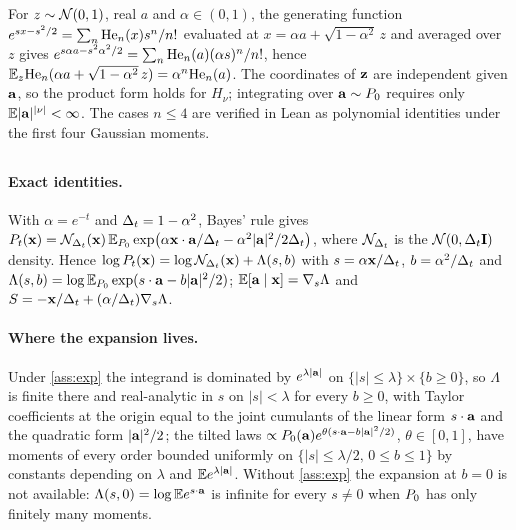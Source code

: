 \subsection{}
For $z\sim\mathcal{N}\!\left(0,1\right)$, real $a$ and $\alpha\in(0,1)$, the
generating function $e^{sx-s^2/2}=\sum_n\mathrm{He}_{n}(x)s^n/n!$ evaluated at
$x=\alpha a+\sqrt{1-\alpha^2}\,z$ and averaged over $z$ gives
$e^{s\alpha a-s^2\alpha^2/2}=\sum_n\mathrm{He}_{n}(a)(\alpha s)^n/n!$, hence
$\mathbb{E}_z\mathrm{He}_{n}(\alpha a+\sqrt{1-\alpha^2}\,z)=\alpha^n\mathrm{He}_{n}(a)$. The coordinates of $\mathbf{z}$ are
independent given $\mathbf{a}$, so the product form holds for $H_\nu$; integrating over
$\mathbf{a}\sim P_0$ requires only $\mathbb{E}|\mathbf{a}|^{|\nu|}<\infty$. The cases $n\le4$ are verified in
Lean as polynomial identities under the first four Gaussian moments.

\subsection{}
\label{app:proof-decay}

\paragraph{Exact identities.}
With $\alpha=e^{-t}$ and $\Delta_t=1-\alpha^2$, Bayes' rule gives
$P_t(\mathbf{x})=\mathcal{N}_{\Delta_t}(\mathbf{x})\,\mathbb{E}_{P_0}\exp\bigl(\alpha\mathbf{x}\cdot\mathbf{a}/\Delta_t-\alpha^2|\mathbf{a}|^2/2\Delta_t\bigr)$,
where $\mathcal{N}_{\Delta_t}$ is the $\mathcal{N}\!\left(0,\Delta_t\mathbf{I}\right)$ density. Hence
$\log P_t(\mathbf{x})=\log\mathcal{N}_{\Delta_t}(\mathbf{x})+\Lambda(s,b)$ with $s=\alpha\mathbf{x}/\Delta_t$, $b=\alpha^2/\Delta_t$
and $\Lambda(s,b)=\log\mathbb{E}_{P_0}\exp(s\cdot\mathbf{a}-b|\mathbf{a}|^2/2)$;
$\mathbb{E}[\mathbf{a}\mid\mathbf{x}]=\nabla_s\Lambda$ and $S=-\mathbf{x}/\Delta_t+(\alpha/\Delta_t)\nabla_s\Lambda$.

\paragraph{Where the expansion lives.}
Under \cref{ass:exp} the integrand is dominated by $e^{\lambda|\mathbf{a}|}$ on
$\{|s|\le\lambda\}\times\{b\ge0\}$, so $\Lambda$ is finite there and real-analytic in $s$
on $|s|<\lambda$ for every $b\ge0$, with Taylor coefficients at the origin equal to the
joint cumulants of the linear form $s\cdot\mathbf{a}$ and the quadratic form $|\mathbf{a}|^2/2$; the
tilted laws $\propto P_0(\mathbf{a})e^{\theta(s\cdot\mathbf{a}-b|\mathbf{a}|^2/2)}$, $\theta\in[0,1]$, have
moments of every order bounded uniformly on $\{|s|\le\lambda/2,\,0\le b\le1\}$ by
constants depending on $\lambda$ and $\mathbb{E} e^{\lambda|\mathbf{a}|}$. Without \cref{ass:exp} the
expansion at $b=0$ is not available: $\Lambda(s,0)=\log\mathbb{E} e^{s\cdot\mathbf{a}}$ is infinite for
every $s\neq0$ when $P_0$ has only finitely many moments.

